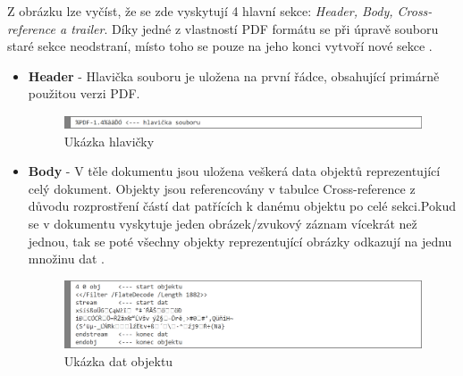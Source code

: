 Z obrázku lze vyčíst, že se zde vyskytují 4 hlavní sekce: \textit{Header, Body, Cross-reference a trailer}. Díky jedné z vlastností PDF formátu se při úpravě souboru staré sekce neodstraní, místo toho se pouze na jeho konci vytvoří nové sekce \cite{PDFInfoSec}.
\begin{itemize}
	\item \textbf{Header} - Hlavička souboru je uložena na první řádce, obsahující primárně použitou verzi PDF.
	\begin{figure}[h!]
	\centering
	\includegraphics[width=15cm]{img/pdf_hlavicka}
	\caption{Ukázka hlavičky}
	\label{fig:pdf_header}
	\end{figure}
	
	\item \textbf{Body} - V těle dokumentu jsou uložena veškerá data objektů reprezentující celý dokument. Objekty jsou referencovány v tabulce Cross-reference z důvodu rozprostření částí dat patřících k danému objektu po celé sekci.Pokud se v dokumentu vyskytuje jeden obrázek/zvukový záznam vícekrát než jednou, tak se poté všechny objekty reprezentující obrázky odkazují na jednu množinu dat \cite{PDFAdobe}.
	\begin{figure}[h!]
	\centering
	\includegraphics[width=15cm]{img/pdf_body}
	\caption{Ukázka dat objektu}
	\label{fig:pdf_body}
	\end{figure}


\end{itemize}

